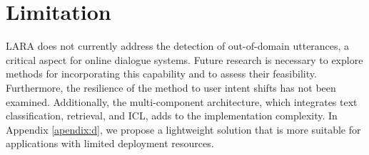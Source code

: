 \section{Limitation}
LARA does not currently address the detection of out-of-domain utterances, a critical aspect for online dialogue systems. Future research is necessary to explore methods for incorporating this capability and to assess their feasibility. Furthermore, the resilience of the method to user intent shifts has not been examined. Additionally, the multi-component architecture, which integrates text classification, retrieval, and ICL, adds to the implementation complexity. In Appendix \ref{apendix:d}, we propose a lightweight solution that is more suitable for applications with limited deployment resources.